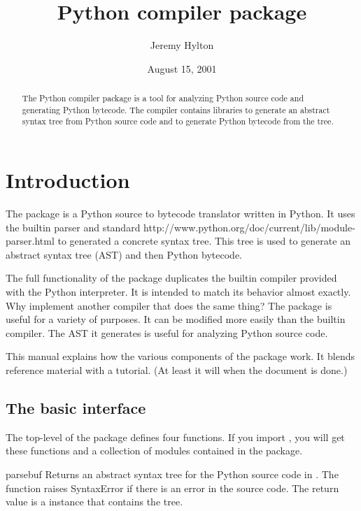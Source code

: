 \documentclass{howto}
\title{Python compiler package}
\author{Jeremy Hylton}
\date{August 15, 2001}           %
\begin{document}
\maketitle

\begin{abstract}

\noindent
The Python compiler package is a tool for analyzing Python source code
and generating Python bytecode.  The compiler contains libraries to
generate an abstract syntax tree from Python source code and to
generate Python bytecode from the tree.

\end{abstract}

\tableofcontents


\section{Introduction\label{Introduction}}

The  package is a Python source to bytecode
translator written in Python.  It uses the builtin parser and standard
{http://www.python.org/doc/current/lib/module-parser.html} to
generated a concrete syntax tree.  This tree is used to generate an
abstract syntax tree (AST) and then Python bytecode.

The full functionality of the package duplicates the builtin compiler
provided with the Python interpreter.  It is intended to match its
behavior almost exactly.  Why implement another compiler that does the
same thing?  The package is useful for a variety of purposes.  It can
be modified more easily than the builtin compiler.  The AST it
generates is useful for analyzing Python source code.

This manual explains how the various components of the
 package work.  It blends reference material with a
tutorial.  (At least it will when the document is done.)

\subsection{The basic interface}


The top-level of the package defines four functions.  If you import
, you will get these functions and a collection of
modules contained in the package.

\begin{funcdesc}{parse}{buf}
Returns an abstract syntax tree for the Python source code in .
The function raises SyntaxError if there is an error in the source
code.  The return value is a  instance that
contains the tree.  
\end{funcdesc}
\end{document}
